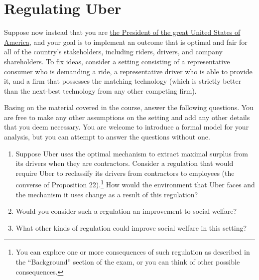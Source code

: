 \documentclass[a4paper]{article}
\begin{document}
	
%
%	


\section{Regulating Uber}
	
	\hypersetup{urlbordercolor=1 1 1}
	Suppose now instead that you are \href{https://youtu.be/4P9TOsmk6LY?t=21}{the President of the great United States of America}, and your goal is to implement an outcome that is optimal and fair for all of the country's stakeholders, including riders, drivers, and company shareholders. To fix ideas, consider a setting consisting of a representative consumer who is demanding a ride, a representative driver who is able to provide it, and a firm that possesses the matching technology (which is strictly better than the next-best technology from any other competing firm). 
	\hypersetup{urlbordercolor=0 1 1}
	
	Basing on the material covered in the course, answer the following questions. You are free to make any other assumptions on the setting and add any other details that you deem necessary. You are welcome to introduce a formal model for your analysis, but you can attempt to answer the questions without one.
	
	\begin{enumerate}
		\item Suppose Uber uses the optimal mechanism to extract maximal surplus from its drivers when they are contractors. Consider a regulation that would require Uber to reclassify its drivers from contractors to employees (the converse of Proposition 22).\footnote{You can explore one or more consequences of such regulation as described in the ``Background'' section of the exam, or you can think of other possible consequences.} How would the environment that Uber faces and the mechanism it uses change as a result of this regulation?
		
		\item Would you consider such a regulation an improvement to social welfare? 
		
		\item What other kinds of regulation could improve social welfare in this setting?
	\end{enumerate}
\end{document}
